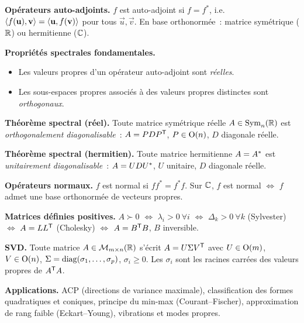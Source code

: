 \begin{tcolorbox}[colback=defcolor!3,colframe=defcolor!60,
  title={\textbf{Résumé --- Chapitre \thechapter}},
  fonttitle=\large,breakable]

\textbf{Opérateurs auto-adjoints.}
$f$ est auto-adjoint si $f = f^*$, i.e.\
$\langle f(\mathbf{u}),\mathbf{v}\rangle = \langle\mathbf{u},f(\mathbf{v})\rangle$ pour tous
$\vec{u}, \vec{v}$. En base orthonormée~: matrice symétrique (${\mathbb{R}}$) ou
hermitienne (${\mathbb{C}}$).

\medskip
\textbf{Propriétés spectrales fondamentales.}
\begin{itemize}[nosep]
  \item Les valeurs propres d'un opérateur auto-adjoint sont \emph{réelles}.
  \item Les sous-espaces propres associés à des valeurs propres distinctes
    sont \emph{orthogonaux}.
\end{itemize}

\medskip
\textbf{Théorème spectral (réel).}
Toute matrice symétrique réelle $A \in \operatorname{Sym}_n({\mathbb{R}})$ est
\emph{orthogonalement diagonalisable}~:
$A = P D {P}^{\mathsf{T}}$, $P \in \operatorname{O}(n)$, $D$ diagonale réelle.

\medskip
\textbf{Théorème spectral (hermitien).}
Toute matrice hermitienne $A = {A}^{*}$ est
\emph{unitairement diagonalisable}~:
$A = U D {U}^{*}$, $U$ unitaire, $D$ diagonale réelle.

\medskip
\textbf{Opérateurs normaux.}
$f$ est normal si $ff^* = f^*f$. Sur ${\mathbb{C}}$, $f$ est normal $\iff$
$f$ admet une base orthonormée de vecteurs propres.

\medskip
\textbf{Matrices définies positives.}
$A \succ 0$ $\iff$ $\lambda_i > 0\ \forall i$ $\iff$ $\Delta_k > 0\
\forall k$ (Sylvester) $\iff$ $A = L{L}^{\mathsf{T}}$ (Cholesky) $\iff$
$A = {B}^{\mathsf{T}}B$, $B$ inversible.

\medskip
\textbf{SVD.}
Toute matrice $A \in \mathcal{M}_{m \times n}({\mathbb{R}})$ s'écrit
$A = U \Sigma {V}^{\mathsf{T}}$ avec $U \in \operatorname{O}(m)$, $V \in \operatorname{O}(n)$,
$\Sigma = \operatorname{diag}(\sigma_1, \ldots, \sigma_p)$, $\sigma_i \geq 0$.
Les $\sigma_i$ sont les racines carrées des valeurs propres de
${A}^{\mathsf{T}}A$.

\medskip
\textbf{Applications.}
ACP (directions de variance maximale), classification des formes
quadratiques et coniques, principe du min-max (Courant--Fischer),
approximation de rang faible (Eckart--Young), vibrations et modes propres.
\end{tcolorbox}
